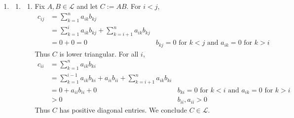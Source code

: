 \documentclass{article}
\renewcommand{\L}{\mathcal{L}}
\begin{document}
\begin{enumerate}
\begin{enumerate}
	\end{enumerate}



	\pagebreak
	
	
	
	\item
	
	\begin{enumerate}
		
		
		
		\item 
		
		\begin{enumerate}
			
			
			
			\item Fix $A,B\in\L$ and let $C:=AB$. For $i<j$,
			\begin{align*}
				c_{ij} &= \sum_{k=1}^n a_{ik}b_{kj} \\
				&= \sum_{k=1}^i a_{ik}b_{kj} + \sum_{k=i+1}^n a_{ik}b_{kj} \\
				&= 0+0 = 0 & \text{$b_{kj}=0$ for $k<j$ and $a_{ik}=0$ for $k>i$}
			\end{align*}
			Thus $C$ is lower triangular. For all $i$,
			\begin{align*}
				c_{ii} &= \sum_{k=1}^n a_{ik}b_{ki} \\
				&= \sum_{k=1}^{i-1} a_{ik}b_{ki} + a_{ii}b_{ii} + \sum_{k=i+1}^n a_{ik}b_{ki} \\
				&= 0 + a_{ii}b_{ii} + 0 & \text{$b_{ki}=0$ for $k<i$ and $a_{ik}=0$ for $k>i$} \\
				&> 0 & b_{ii},a_{ii}>0
			\end{align*}
			Thus $C$ has positive diagonal entries. We conclude $C\in\L$.
			
			
			

\end{enumerate}
\end{enumerate}
\end{enumerate}
\end{document}
